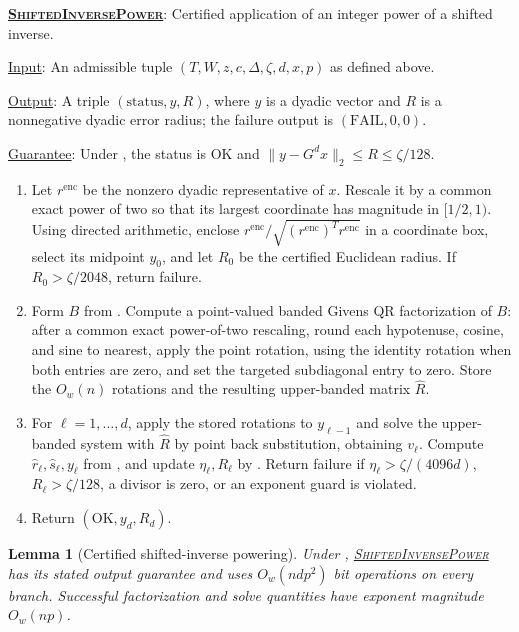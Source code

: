 \documentclass[11pt]{article}
\newenvironment{fminipage}%
  {\begin{Sbox}\begin{minipage}}%
  {\end{minipage}\end{Sbox}\fbox{\TheSbox}}
\newenvironment{algbox}[0]{%
\vskip 0.2in
\noindent
\begin{fminipage}{6.3in}
}{%
\end{fminipage}
\vskip 0.2in
}
\newtheorem{lemma}{Lemma}[section]
\newcommand{\ShiftedInversePower}{%
  \textnormal{\textsc{Shifted\hspace{0pt}Inverse\hspace{0pt}Power}}}
\begin{document}
\begin{algbox}
\textbf{\uline{\ShiftedInversePower}}: Certified application of an
integer power of a shifted inverse.
\label{alg:inverse-power}

\uline{Input}: An admissible tuple
$(T,W,z,c,\Delta,\zeta,d,x,p)$ as defined above.

\uline{Output}: A triple $(\mathrm{status},y,R)$, where $y$ is a dyadic vector and
$R$ is a nonnegative dyadic error radius; the failure output is
$(\mathrm{FAIL},0,0)$.

\uline{Guarantee}: Under , the status is
$\mathrm{OK}$ and
$\lVert y-G^dx\rVert_2\leq R\leq\zeta/128$.

\begin{enumerate}
 \item Let $r^{\mathrm{enc}}$ be the nonzero dyadic representative of $x$.
 Rescale it by a common exact power of two so that its largest coordinate has
 magnitude in $[1/2,1)$.  Using directed arithmetic, enclose
 $r^{\mathrm{enc}}/\sqrt{(r^{\mathrm{enc}})^Tr^{\mathrm{enc}}}$ in a
 coordinate box, select its midpoint $y_0$, and let $R_0$ be the certified
 Euclidean radius.  If $R_0>\zeta/2048$, return failure.
 \item Form $B$ from .  Compute a point-valued
 banded Givens QR factorization of $B$: after a common exact power-of-two
 rescaling, round each hypotenuse, cosine, and sine to nearest, apply the
 point rotation, using the identity rotation when both entries are zero, and
 set the targeted subdiagonal entry to zero.  Store the
 $O_w(n)$ rotations and the resulting upper-banded matrix $\widehat R$.
 \item For $\ell=1,\ldots,d$, apply the stored rotations to $y_{\ell-1}$ and
 solve the upper-banded system with $\widehat R$ by point back substitution,
 obtaining $v_\ell$.  Compute $\widehat r_\ell,\widehat s_\ell,y_\ell$ from
 , and
 update $\eta_\ell,R_\ell$ by
 .  Return failure if
 $\eta_\ell>\zeta/(4096d)$, $R_\ell>\zeta/128$, a divisor is zero, or an
 exponent guard is violated.
 \item Return $(\mathrm{OK},y_d,R_d)$.
\end{enumerate}
\end{algbox}

\begin{lemma}[Certified shifted-inverse powering]
\label{lem:shifted-inverse-power}
Under ,
\hyperref[alg:inverse-power]{\ShiftedInversePower} has its stated
output guarantee and uses $O_w(ndp^2)$ bit operations on every branch.
Successful factorization and solve quantities have exponent magnitude
$O_w(np)$.
\end{lemma}
\end{document}
